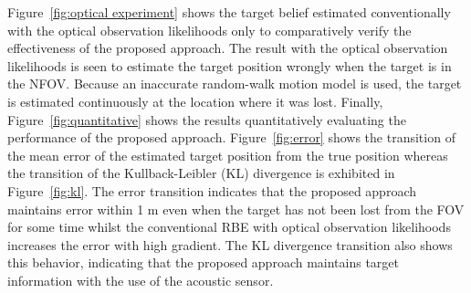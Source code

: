 Figure~\ref{fig:optical experiment} shows the target belief estimated conventionally with the optical observation likelihoods only to comparatively verify the effectiveness of the proposed approach.  The result with the optical observation likelihoods is seen to estimate the target position wrongly when the target is in the NFOV.  Because an inaccurate random-walk motion model is used, the target is estimated continuously at the location where it was lost.  Finally, Figure~\ref{fig:quantitative} shows the results quantitatively evaluating the performance of the proposed approach.  Figure~\ref{fig:error} shows the transition of the mean error of the estimated target position from the true position whereas the transition of the Kullback-Leibler (KL) divergence is exhibited in Figure~\ref{fig:kl}.  The error transition indicates that the proposed approach maintains error within 1 m even when the target has not been lost from the FOV for some time whilst the conventional RBE with optical observation likelihoods increases the error with high gradient.  The KL divergence transition also shows this behavior, indicating that the proposed approach maintains target information with the use of the acoustic sensor.  

